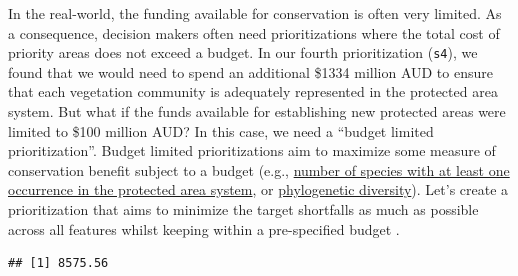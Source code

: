 \documentclass[
  12pt,
]{book}
\newenvironment{Shaded}{\begin{snugshade}}{\end{snugshade}}
\newcommand{\CommentTok}[1]{\textcolor[rgb]{0.56,0.35,0.01}{\textit{#1}}}
\newcommand{\DecValTok}[1]{\textcolor[rgb]{0.00,0.00,0.81}{#1}}
\newcommand{\FunctionTok}[1]{\textcolor[rgb]{0.00,0.00,0.00}{#1}}
\newcommand{\NormalTok}[1]{#1}
\newcommand{\OtherTok}[1]{\textcolor[rgb]{0.56,0.35,0.01}{#1}}
\newcommand{\SpecialCharTok}[1]{\textcolor[rgb]{0.00,0.00,0.00}{#1}}
\begin{document}
In the real-world, the funding available for conservation is often very limited. As a consequence, decision makers often need prioritizations where the total cost of priority areas does not exceed a budget. In our fourth prioritization (\texttt{s4}), we found that we would need to spend an additional \$1334 million AUD to ensure that each vegetation community is adequately represented in the protected area system. But what if the funds available for establishing new protected areas were limited to \$100 million AUD? In this case, we need a ``budget limited prioritization''. Budget limited prioritizations aim to maximize some measure of conservation benefit subject to a budget (e.g., \href{https://prioritizr.net/reference/add_max_cover_objective.html}{number of species with at least one occurrence in the protected area system}, or \href{https://prioritizr.net/reference/add_max_phylo_div_objective.html}{phylogenetic diversity}). Let's create a prioritization that aims to minimize the target shortfalls as much as possible across all features whilst keeping within a pre-specified budget \citep[following][]{r8}.

\begin{Shaded}
\end{Shaded}

\begin{verbatim}
## [1] 8575.56
\end{verbatim}

\clearpage
\end{document}
